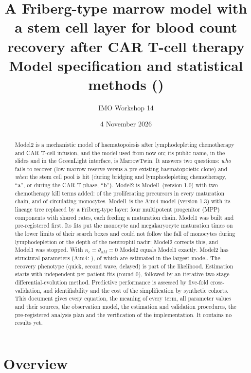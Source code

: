 \documentclass[11pt]{article}
\title{A Friberg-type marrow model with a stem cell layer for blood count recovery after CAR T-cell therapy\\[4pt]
\large Model specification and statistical methods (\valVersion)}
\author{IMO Workshop 14}
\date{4 November 2026}
\begin{document}
\maketitle

\begin{abstract}
\noindent Model2 is a mechanistic model of haematopoiesis after lymphodepleting chemotherapy and CAR T-cell infusion, and the model used from now on; its public name, in the slides and in the GreenLight interface, is MarrowTwin. It answers two questions: \emph{who} fails to recover (low marrow reserve versus a pre-existing haematopoietic clone) and \emph{when} the stem cell pool is hit (during bridging and lymphodepleting chemotherapy, ``a'', or during the CAR T phase, ``b''). Model2 is Model1 (version 1.0) with two chemotherapy kill terms added: of the proliferating precursors in every maturation chain, and of circulating monocytes. Model1 is the Aim4 model (version 1.3) with its lineage tree replaced by a Friberg-type layer: four multipotent progenitor (MPP) components with shared rates, each feeding a maturation chain. Model1 was built and pre-registered first. Its fits put the monocyte and megakaryocyte maturation times on the lower limits of their search boxes and could not follow the fall of monocytes during lymphodepletion or the depth of the neutrophil nadir; Model2 corrects this, and Model1 was stopped. With $\kappa_c=\theta_{aM}=0$ Model2 equals Model1 exactly. Model2 has \valNStruct{} structural parameters (Aim4: \valNStructAimFour), of which \valNEst{} are estimated in the largest model. The recovery phenotype (quick, second wave, delayed) is part of the likelihood. Estimation starts with independent per-patient fits (round 0), followed by an iterative two-stage differential-evolution method. Predictive performance is assessed by five-fold cross-validation, and identifiability and the cost of the simplification by synthetic cohorts. This document gives every equation, the meaning of every term, all parameter values and their sources, the observation model, the estimation and validation procedures, the pre-registered analysis plan and the verification of the implementation. It contains no results yet.
\end{abstract}

\tableofcontents
\clearpage

\section{Overview}
\end{document}
